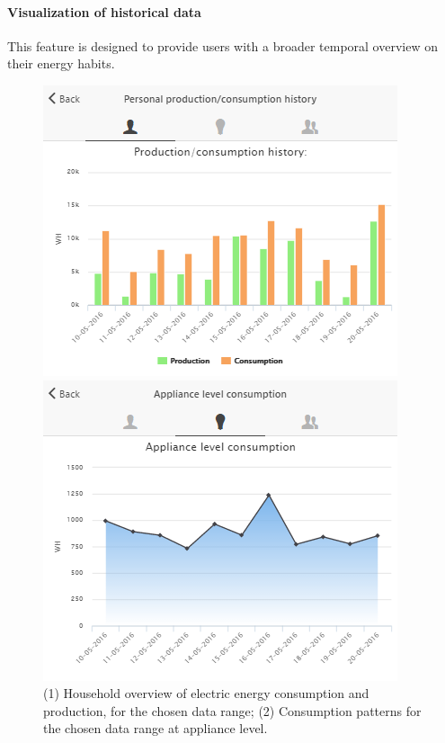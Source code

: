 \paragraph{Visualization of historical data} 

This feature is designed to provide users with a broader temporal overview on their energy habits.
\begin{figure}[htb]
      \begin{center}
        \begin{minipage}[htb]{0.45\linewidth}    
         \includegraphics[width=1\linewidth]{img/historicalcomparison_prodcons.png}
        \end{minipage}
        \begin{minipage}[htb]{0.45\linewidth}    
         \includegraphics[width=1\linewidth]{img/applianceconsumption.png}
        \end{minipage}
      \end{center}
      \caption{(1) Household overview of electric energy consumption and production, for the chosen data range; (2) Consumption patterns for the chosen data range at appliance level.
}
\label{fig:viz_hist}
\end{figure}

